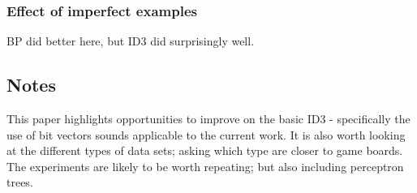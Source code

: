 \subsubsection{Effect of imperfect examples}
BP did better here, but ID3 did surprisingly well.
\subsection{Notes}    
This paper highlights opportunities to improve on the basic ID3 - specifically the use of bit vectors sounds applicable to the current work.  It is also worth looking at the different types of data sets; asking which type are closer to game boards.  The experiments are likely to be worth repeating; but also including perceptron trees\cite{utgoff:trees}. 